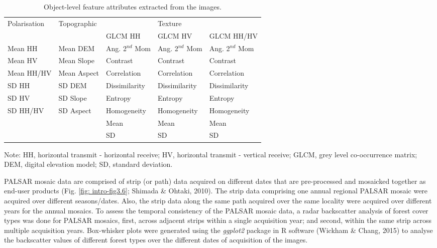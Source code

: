 \begin{spacing}{1.0}
\begin{longtable}[h!]{ p{2.6cm} p{2.6cm} p{2.6cm} p{2.6cm} p{2.6cm} }

    \caption[Object-level feature attributes extracted from the images.]{Object-level feature attributes extracted from the images.}
    \label{tab: method-table3.2}\\
    
    	\toprule
    	Polarisation & Topographic & {} & Texture & {}\\
    	\cmidrule{3-5}
    	{} & {} & GLCM HH & GLCM HV & GLCM HH/HV\\
    	\midrule
    	\endhead
    	
		Mean HH & Mean DEM & Ang. 2$^{nd}$ Mom & Ang. 2$^{nd}$ Mom & Ang. 2$^{nd}$ Mom\\
		Mean HV & Mean Slope & Contrast & Contrast & Contrast\\
		Mean HH/HV & Mean Aspect & Correlation & Correlation & Correlation\\
		SD HH & SD DEM & Dissimilarity & Dissimilarity & Dissimilarity\\
		SD HV & SD Slope & Entropy & Entropy & Entropy\\
		SD HH/HV & SD Aspect & Homogeneity & Homogeneity & Homogeneity\\
		{} & {} & Mean & Mean & Mean\\
		{} & {} & SD & SD & SD\\
		
		\bottomrule
    
\end{longtable}

	\noindent Note: HH, horizontal transmit - horizontal receive; HV, horizontal transmit - vertical receive; GLCM, grey level co-occurrence matrix; DEM, digital elevation model; SD, standard deviation.\\ \newline

\end{spacing}

PALSAR mosaic data are comprised of strip (or path) data acquired on different dates that are pre-processed and mosaicked together as end-user products (Fig. \ref{fig: intro-fig3.6}; Shimada \& Ohtaki, 2010). The strip data comprising one annual regional PALSAR mosaic were acquired over different seasons/dates. Also, the strip data along the same path acquired over the same locality were acquired over different years for the annual mosaics. To assess the temporal consistency of the PALSAR mosaic data, a radar backscatter analysis of forest cover types was done for PALSAR mosaics, first, across adjacent strips within a single acquisition year; and second, within the same strip across multiple acquisition years. Box-whisker plots were generated using the \textit{ggplot2} package in R software (Wickham \& Chang, 2015) to analyse the backscatter values of different forest types over the different dates of acquisition of the images.\\

